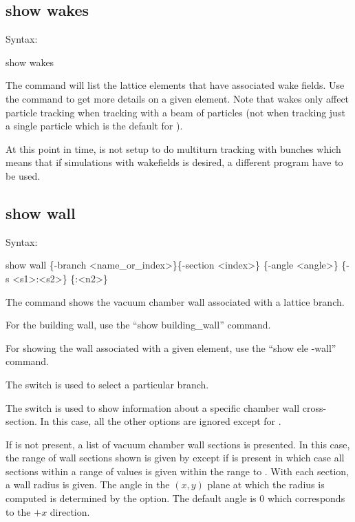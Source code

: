 {{{{{{{{{\subsection{show wakes}
\label{s:show.wakes}

Syntax:
\begin{example}
  show wakes 
\end{example}

The  command will list the lattice elements that have associated wake fields.  Use
the  command to get more details on a given element. Note that wakes only affect
particle tracking when tracking with a beam of particles (not when tracking just a single particle
which is the default for \tao).

At this point in time, \tao is not setup to do multiturn tracking with bunches which means that if
simulations with wakefields is desired, a different program have to be used.


\subsection{show wall}
\label{s:show.wall}

Syntax:
\begin{example}
  show wall \{-branch <name_or_index>\}\{-section <index>\} \{-angle <angle>\}
  \{-s <s1>:<s2>\} \{<n1>:<n2>\}
\end{example}

The  command shows the vacuum chamber wall associated with a lattice branch.

For the building wall, use the ``show building_wall'' command.

For showing the wall associated with a given element, use the ``show ele -wall'' command.

The  switch is used to select a particular branch.

The  switch is used to show information about a specific chamber wall cross-section. In
this case, all the other options are ignored except for .

If  is not present, a list of vacuum chamber wall sections is presented. In this case,
the range of wall sections shown is given by  except if  is present in which
case all sections within a range of  values is given within the range  to
. With each section, a wall radius is given. The angle in the $(x,y)$ plane at which the
radius is computed is determined by the  option. The default angle is 0 which corresponds
to the $+x$ direction.

}}}}}}}}}

